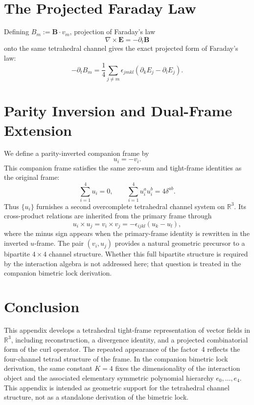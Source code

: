 \documentclass[11pt, letterpaper]{article}
\begin{document}
\section{The Projected Faraday Law}
Defining \(B_m := \mathbf{B} \cdot v_m\), projection of Faraday's law
\begin{equation}
    \nabla \times \mathbf{E} = -\partial_t \mathbf{B}
\end{equation}
onto the same tetrahedral channel gives the exact projected form of Faraday's law:
\begin{equation}
    -\partial_t B_m = \frac{1}{4} \sum_{j \neq m} \epsilon_{jmkl} (\partial_k E_j - \partial_l E_j).
\end{equation}

\section{Parity Inversion and Dual-Frame Extension}
We define a parity-inverted companion frame by
\begin{equation}
    u_i = -v_i.
\end{equation}
This companion frame satisfies the same zero-sum and tight-frame identities as the original frame:
\begin{equation}
    \sum_{i=1}^4 u_i = 0, \qquad \sum_{i=1}^4 u_i^a u_i^b = 4\delta^{ab}.
\end{equation}
Thus $\{u_i\}$ furnishes a second overcomplete tetrahedral channel system on $\mathbb{R}^3$. Its cross-product relations are inherited from the primary frame through
\begin{equation}
    u_i \times u_j = v_i \times v_j = -\epsilon_{ijkl}(u_k - u_l),
\end{equation}
where the minus sign appears when the primary-frame identity is rewritten in the inverted $u$-frame. The pair $(v_i, u_j)$ provides a natural geometric precursor to a bipartite $4 \times 4$ channel structure. Whether this full bipartite structure is required by the interaction algebra is not addressed here; that question is treated in the companion bimetric lock derivation.

\section*{Conclusion}
This appendix develops a tetrahedral tight-frame representation of vector fields in $\mathbb{R}^3$, including reconstruction, a divergence identity, and a projected combinatorial form of the curl operator. The repeated appearance of the factor~4 reflects the four-channel tetrad structure of the frame. In the companion bimetric lock derivation, the same constant $K=4$ fixes the dimensionality of the interaction object and the associated elementary symmetric polynomial hierarchy $e_0,\dots,e_4$. This appendix is intended as geometric support for the tetrahedral channel structure, not as a standalone derivation of the bimetric lock.
\end{document}
